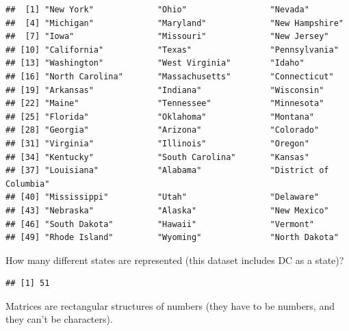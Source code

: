\documentclass[]{book}
\newenvironment{Shaded}{\begin{snugshade}}{\end{snugshade}}
\newcommand{\KeywordTok}[1]{\textcolor[rgb]{0.13,0.29,0.53}{\textbf{#1}}}
\newcommand{\OperatorTok}[1]{\textcolor[rgb]{0.81,0.36,0.00}{\textbf{#1}}}
\newcommand{\NormalTok}[1]{#1}
\theoremstyle{definition}
\theoremstyle{definition}
\theoremstyle{definition}
\theoremstyle{remark}
\begin{document}
\begin{Shaded}
\end{Shaded}

\begin{verbatim}
##  [1] "New York"             "Ohio"                 "Nevada"              
##  [4] "Michigan"             "Maryland"             "New Hampshire"       
##  [7] "Iowa"                 "Missouri"             "New Jersey"          
## [10] "California"           "Texas"                "Pennsylvania"        
## [13] "Washington"           "West Virginia"        "Idaho"               
## [16] "North Carolina"       "Massachusetts"        "Connecticut"         
## [19] "Arkansas"             "Indiana"              "Wisconsin"           
## [22] "Maine"                "Tennessee"            "Minnesota"           
## [25] "Florida"              "Oklahoma"             "Montana"             
## [28] "Georgia"              "Arizona"              "Colorado"            
## [31] "Virginia"             "Illinois"             "Oregon"              
## [34] "Kentucky"             "South Carolina"       "Kansas"              
## [37] "Louisiana"            "Alabama"              "District of Columbia"
## [40] "Mississippi"          "Utah"                 "Delaware"            
## [43] "Nebraska"             "Alaska"               "New Mexico"          
## [46] "South Dakota"         "Hawaii"               "Vermont"             
## [49] "Rhode Island"         "Wyoming"              "North Dakota"
\end{verbatim}

How many different states are represented (this dataset includes DC as a
state)?

\begin{Shaded}
\end{Shaded}

\begin{verbatim}
## [1] 51
\end{verbatim}

Matrices are rectangular structures of numbers (they have to be numbers,
and they can't be characters).
\end{document}
